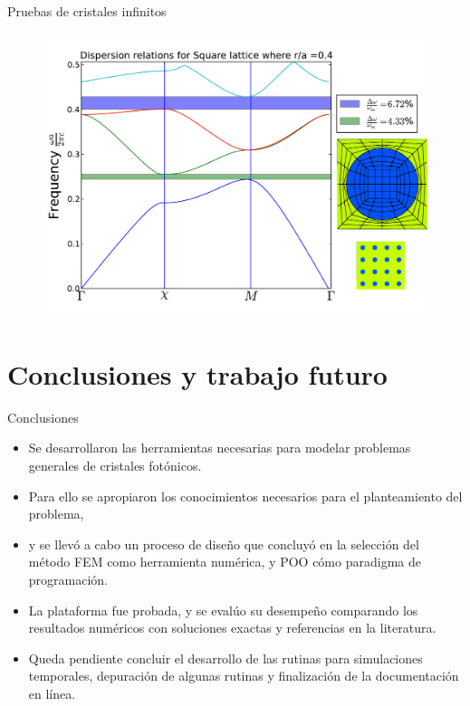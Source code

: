 \documentclass[xcolor=table,serif]{beamer}
\begin{document}
\begin{frame}{Pruebas de cristales infinitos}
{\begin{figure}
	\includegraphics[scale=0.5]{square_lattice_ra04.pdf}
	\end{figure}
	}
	\end{frame}
\section{Conclusiones y trabajo futuro}	
	\begin{frame}{Conclusiones}
	
	\begin{itemize}
	\item Se desarrollaron las herramientas necesarias para modelar problemas generales de cristales fotónicos.
	\item Para ello se apropiaron los conocimientos necesarios para el planteamiento del problema, 
	\item y se llevó a cabo un proceso de diseño que concluyó en la selección del método FEM como herramienta numérica, y POO cómo paradigma de programación.
	\item  La plataforma fue probada, y se evalúo su desempeño comparando los resultados numéricos con soluciones exactas y referencias en la literatura.
	\item Queda pendiente concluir el desarrollo de las rutinas para simulaciones temporales, depuración de algunas rutinas y finalización de la documentación en línea.
	\end{itemize}
	\end{frame}
\end{document}
